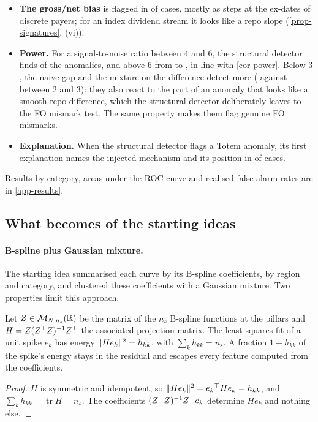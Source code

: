 \begin{itemize}
\item \textbf{The gross/net bias} is flagged in \vGrossStruct{} of cases, mostly as steps at the ex-dates of discrete
payers; for an index dividend stream it looks like a repo slope (\cref{prop-signatures}, (vi)).
\item \textbf{Power.} For a signal-to-noise ratio between $4$ and $6$, the structural detector finds \vPowStructE{} of
the anomalies, and above $6$ from \vPowStructF{} to \vPowStructH, in line with \cref{cor-power}. Below $3$, the naive
gap and the mixture on the difference detect more (\vPowGmmDiffC{} against \vPowStructC{} between $2$ and $3$): they
also react to the part of an anomaly that looks like a smooth repo difference, which the structural detector
deliberately leaves to the FO mismark test. The same property makes them flag genuine FO mismarks.
\item \textbf{Explanation.} When the structural detector flags a Totem anomaly, its first explanation names the
injected mechanism and its position in \vAttr{} of cases.
\end{itemize}
Results by category, areas under the ROC curve and realised false alarm rates are in \cref{app-results}.

\subsection{What becomes of the starting ideas}
\paragraph{B-spline plus Gaussian mixture.} The starting idea summarised each curve by its B-spline coefficients, by
region and category, and clustered these coefficients with a Gaussian mixture. Two properties limit this approach.

\begin{proposition}\label{prop-leverage}
Let $Z\in\mathcal{M}_{N,n_s}(\mathbb{R})$ be the matrix of the $n_s$ B-spline functions at the pillars and $H=Z({Z}^{\top}Z)^{-1}{Z}^{\top}$ the
associated projection matrix. The least-squares fit of a unit spike $e_k$ has energy $\lVert He_k\rVert^2=h_{kk}$, with
$\sum_kh_{kk}=n_s$. A fraction $1-h_{kk}$ of the spike's energy stays in the residual and escapes every feature computed
from the coefficients.
\end{proposition}
\begin{proof}
$H$ is symmetric and idempotent, so $\lVert He_k\rVert^2={e_k}^{\top}He_k=h_{kk}$, and $\sum_kh_{kk}=\operatorname{tr}H=n_s$. The
coefficients $({Z}^{\top}Z)^{-1}{Z}^{\top}e_k$ determine $He_k$ and nothing else.
\end{proof}


